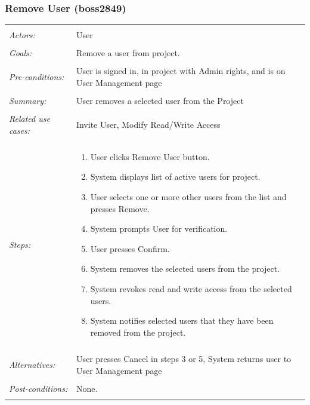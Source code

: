 \documentclass[11pt]{article}
\begin{document}
\subsubsection{Remove User  (boss2849)}
\begin{tabular}{ p{2cm} p{12cm} }
 \hline
 \\
 \textit{Actors:} & User \\ 
 \\
 \textit{Goals:} & Remove a user from project. \\
 \\
 \textit{Pre-conditions:} & User is signed in, in project with Admin rights, and is on User Management page\\
 \\
 \textit{Summary:} & User removes a selected user from the Project \\ 
 \\
 \textit{Related use cases:} & Invite User, Modify Read/Write Access \\ 
 \\
 \textit{Steps:} & \begin{enumerate}
  \item User clicks Remove User button.
  \item System displays list of active users for project.
  \item User selects one or more other users from the list and presses Remove.
  \item System prompts User for verification.
  \item User presses Confirm.
  \item System removes the selected users from the project.
  \item System revokes read and write access from the selected users.
  \item System notifies selected users that they have been removed from the project.
 \end{enumerate} \\
 \\
 \textit{Alternatives:} & User presses Cancel in steps 3 or 5, System returns user to User Management page \\
 \\
 \textit{Post-conditions:} & None. \\
 \\
\hline
\end{tabular}
\end{document}

